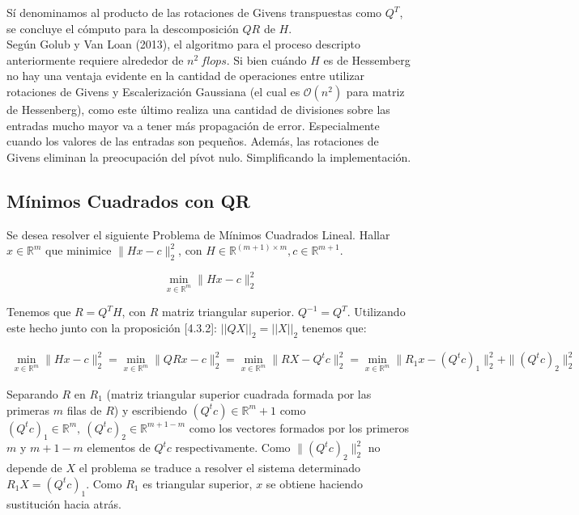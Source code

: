 \documentclass{endm}
\begin{document}
Sí denominamos al producto de las rotaciones de Givens transpuestas como $Q^T$, se concluye el c\'omputo para la descomposici\'on $QR$ de $H$.\\
Seg\'un Golub y Van Loan (2013)\cite{matrixcomp}, el algoritmo para el proceso descripto anteriormente requiere alrededor de $n^2 \ flops$. Si bien cuándo $H$ es de Hessemberg no hay una ventaja evidente en la cantidad de operaciones entre utilizar rotaciones de Givens y Escalerización Gaussiana (el cual es $\mathcal{O}(n^2)$ para matriz  de Hessenberg), como este último realiza una cantidad de divisiones sobre las entradas mucho mayor va a tener más propagación de error. Especialmente cuando los valores de las entradas son pequeños. Además, las rotaciones de Givens eliminan la preocupación del pívot nulo. Simplificando la implementación.


\subsection{M\'inimos Cuadrados con QR} \label{mcqr}

Se desea resolver el siguiente Problema de M\'inimos Cuadrados Lineal. Hallar $x \in \mathbb{R}^m$ que minimice $\|H x - c\|_{2}^2$, con $H \in \mathbb{R}^{(m+1) \times m}, c \in \mathbb{R}^{m+1}$.

\begin{equation*}
    \min_{x \in \mathbb{R}^m} \|H x - c\|_2^2
\end{equation*}

Tenemos que $R = Q^{T}H$, con $R$ matriz triangular superior. $Q^{-1} = Q^{T}$. Utilizando este hecho junto con la proposición [4.3.2]\cite{notasteo}: $||QX||_2=||X||_2$ tenemos que:

\begin{multline*}
    \min_{x \in \mathbb{R}^m} \|H x - c\|_2^2 = \min_{x \in \mathbb{R}^m} \|QR x - c\|_2^2 = \min_{x \in \mathbb{R}^m} \|RX - Q^tc\|_2^2=\min_{x \in \mathbb{R}^m}\|R_1 x - (Q^tc)_1\|_2^2 + \|(Q^tc)_2\|_2^2
\end{multline*}

Separando $R$ en $R_1$ (matriz triangular superior cuadrada formada por las primeras $m$ filas de $R$) y escribiendo $(Q^tc) \in \mathbb{R}^m+1$ como $(Q^tc)_1 \in \mathbb{R}^m, \ (Q^tc)_2 \in \mathbb{R}^{m+1-m}$ como los vectores formados por los primeros $m$ y $m+1-m$ elementos de $Q^tc$ respectivamente. Como $ \|(Q^tc)_2\|_2^2$ no depende de $X$ el problema se traduce a resolver el sistema determinado $R_1 X = (Q^tc)_1$. Como $R_1$ es triangular superior, $x$ se obtiene haciendo sustituci\'on hacia atr\'as.\\
\end{document}
